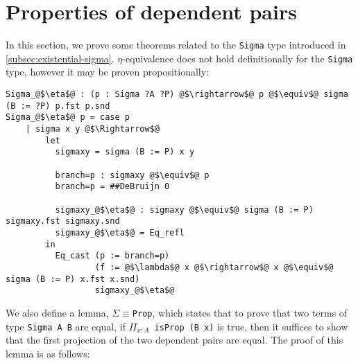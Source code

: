 \documentclass[12pt,twoside,maitrise]{dms}
\theoremstyle{definition}
\numberwithin{equation}{section}
\numberwithin{table}{chapter}
\numberwithin{figure}{chapter}
\newcommand\id[1] {\texttt{#1}}
\newcommand\fn[1] {\texttt{#1}}
\begin{document}
\section{Properties of dependent pairs}\label{app:deppairs-properties}

In this section, we prove some theorems related to the \id{Sigma} type
introduced in \autoref{subsec:existential-sigma}. $\eta$-equivalence does not
hold definitionally for the \id{Sigma} type, however it may be proven
propositionally:

\begin{verbatim}
Sigma_@$\eta$@ : (p : Sigma ?A ?P) @$\rightarrow$@ p @$\equiv$@ sigma (B := ?P) p.fst p.snd
Sigma_@$\eta$@ p = case p
    | sigma x y @$\Rightarrow$@
        let
          sigmaxy = sigma (B := P) x y

          branch=p : sigmaxy @$\equiv$@ p
          branch=p = ##DeBruijn 0

          sigmaxy_@$\eta$@ : sigmaxy @$\equiv$@ sigma (B := P) sigmaxy.fst sigmaxy.snd
          sigmaxy_@$\eta$@ = Eq_refl
        in
          Eq_cast (p := branch=p)
                  (f := @$\lambda$@ x @$\rightarrow$@ x @$\equiv$@ sigma (B := P) x.fst x.snd)
                  sigmaxy_@$\eta$@
\end{verbatim}

We also define a lemma, \id{$\Sigma${}$\equiv${}Prop}, which states that to
prove that two terms of type \fn{Sigma A B} are equal, if \fn{$\Pi_{x : A}$
  isProp (B x)} is true, then it suffices to show that the first projection of
the two dependent pairs are equal. The proof of this lemma is as follows:
\end{document}
